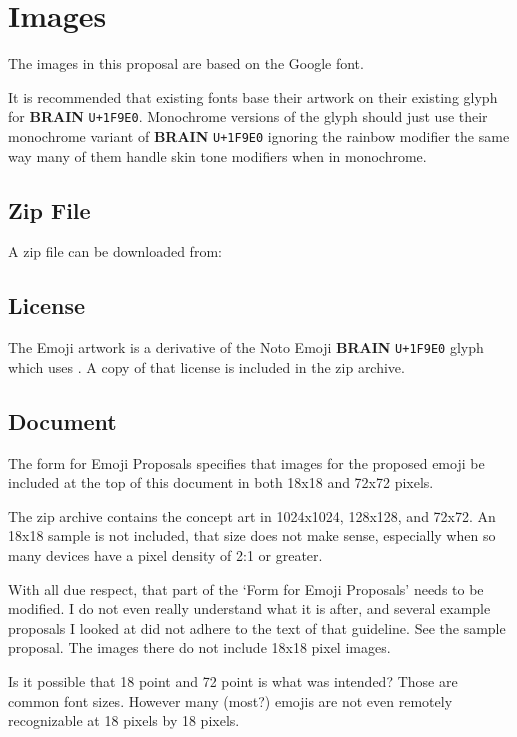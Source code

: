\section{Images}

The images in this proposal are based on the Google\textsuperscript{\textregistered}  font.

It is recommended that existing fonts base their artwork on their existing glyph for \textbf{BRAIN} \texttt{U+1F9E0}. Monochrome versions of the glyph should just use their monochrome variant of \textbf{BRAIN} \texttt{U+1F9E0} ignoring the rainbow modifier the same way many of them handle skin tone modifiers when in monochrome.

\subsection{Zip File}
A zip file can be downloaded from: 

\subsection{License}

The Emoji artwork is a derivative of the Noto Emoji \textbf{BRAIN} \texttt{U+1F9E0} glyph which uses . A copy of that license is included in the zip archive.

\subsection{Document}

The form for Emoji Proposals specifies that images for the proposed emoji be included at the top of this document in both 18x18 and 72x72 pixels.

The zip archive contains the concept art in 1024x1024, 128x128, and 72x72. An 18x18 sample is not included, that size does not make sense, especially when so many devices have a pixel density of 2:1 or greater.

With all due respect, that part of the `Form for Emoji Proposals' needs to be modified. I do not even really understand what it is after, and several example proposals I looked at did not adhere to the text of that guideline. See the  sample proposal. The images there do not include 18x18 pixel images.

Is it possible that 18 point and 72 point is what was intended? Those are common font sizes. However many (most?) emojis are not even remotely recognizable at 18 pixels by 18 pixels.

